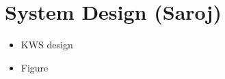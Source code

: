 \section{System Design (Saroj)}
\label{sec:system_design}
\begin{itemize}
    \item KWS design
    \item Figure
\end{itemize}